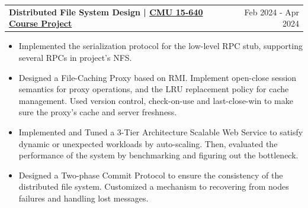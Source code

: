 \documentclass[a4paper,20pt]{article}
\makeatletter
\newcommand{\resumeProjectsSubHeading}[2]{
  \resumeProjectsSubHeadingItem{#1}{#2}
  \vspace{-10pt}
}
\newcommand{\resumeProjectsSubHeadingItem}[2]{
  \vspace{-1pt}
  \item{
    \begin{tabular*} {0.98\textwidth} {@{\hspace{-0.5em}}l@{\extracolsep{\fill}}r}
      \textbf{#1} & {#2} \\
    \end{tabular*}
  \vspace{-8pt}
  }
}
\newcommand{\resumeProjectsItemListStart}{
  \begin{itemize} [leftmargin=*]
}
\newcommand{\resumeProjectsItemListEnd}{
  \end{itemize}
  \vspace{0pt}
}
\newcommand{\resumeProjectsItem}[1]{
  \item{
    {#1} \vspace{-2pt}
  }
}
\makeatother
\begin{document}

\resumeProjectsSubHeading{{Distributed File System Design} {| \href{https://github.com/Guo-lab/15640-Distributed-Systems}{CMU 15-640 Course Project \faIcon{github}}}}{Feb 2024 - Apr 2024}
\resumeProjectsItemListStart
\resumeProjectsItem{Implemented the serialization protocol for the low-level RPC stub, supporting several RPCs in project's NFS.}
\vspace{-1pt}
\resumeProjectsItem{Designed a File-Caching Proxy based on RMI. Implement open-close session semantics for proxy operations, and the LRU replacement policy for cache management. Used version control, check-on-use and last-close-win to make sure the proxy's cache and server freshness.}
\vspace{-1pt}
\resumeProjectsItem{Implemented and Tuned a 3-Tier Architecture Scalable Web Service to satisfy dynamic or unexpected workloads by auto-scaling. Then, evaluated the performance of the system by benchmarking and figuring out the bottleneck.}
\vspace{-1pt}
\resumeProjectsItem{Designed a Two-phase Commit Protocol to ensure the consistency of the distributed file system. Customized a mechanism to recovering from nodes failures and handling lost messages.}
\resumeProjectsItemListEnd

\end{document}
